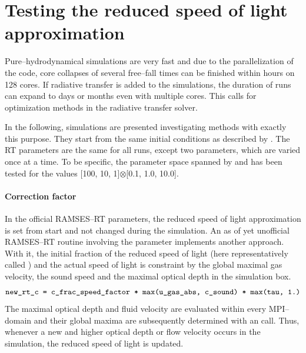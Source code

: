 
\chapter{Testing the reduced speed of light approximation} %

\label{AppendixD} %

Pure--hydrodynamical simulations are very fast and due to the parallelization of the code, core collapses of several free--fall times can be finished within hours on 128 cores.
If radiative transfer is added to the simulations, the duration of runs can expand to days or months even with multiple cores.
This calls for optimization methods in the radiative transfer solver.

In the following, simulations are presented investigating methods with exactly this purpose.
They start from the same initial conditions as described by .
The RT parameters are the same for all runs, except two parameters, which are varied once at a time.
To be specific, the parameter space spanned by  and  has been tested for the values [100, 10, 1]$\otimes$[0.1, 1.0, 10.0].

\subsubsection{Correction factor}
In the official RAMSES--RT parameters, the reduced speed of light approximation is set from start and not changed during the simulation.
An as of yet unofficial RAMSES--RT routine involving the parameter  implements another approach.
With it, the initial fraction of the reduced speed of light (here representatively called ) and the actual speed of light is constraint by the global maximal gas velocity, the sound speed and the maximal optical depth in the simulation box.
\begin{equation*}
  \texttt{new\_rt\_c = c\_frac\_speed\_factor * max(u\_gas\_abs, c\_sound) * max(tau, 1.)}
\end{equation*}
The maximal optical depth  and fluid velocity  are evaluated within every MPI--domain and their global maxima are subsequently determined with an  call.
Thus, whenever a new and higher optical depth or flow velocity occurs in the simulation, the reduced speed of light is updated.


